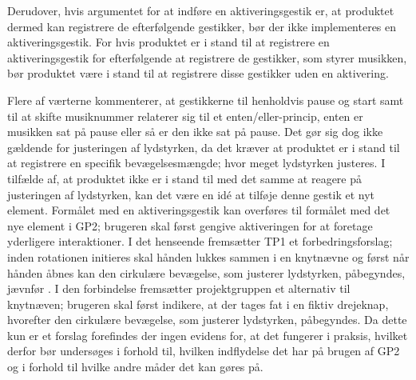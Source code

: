 Derudover, hvis argumentet for at indføre en aktiveringsgestik er, at produktet dermed kan registrere de efterfølgende gestikker, bør der ikke implementeres en aktiveringsgestik. For hvis produktet er i stand til at registrere en aktiveringsgestik for efterfølgende at registrere de gestikker, som styrer musikken, bør produktet være i stand til at registrere disse gestikker uden en aktivering. 

Flere af værterne kommenterer, at gestikkerne til henholdvis pause og start samt til at skifte musiknummer relaterer sig til et enten/eller-princip, enten er musikken sat på pause eller så er den ikke sat på pause. Det gør sig dog ikke gældende for justeringen af lydstyrken, da det kræver at produktet er i stand til at registrere en specifik bevægelsesmængde; hvor meget lydstyrken justeres. I tilfælde af, at produktet ikke er i stand til med det samme at reagere på justeringen af lydstyrken, kan det være en idé at tilføje denne gestik et nyt element. Formålet med en aktiveringsgestik kan overføres til formålet med det nye element i GP2; brugeren skal først gengive aktiveringen for at foretage yderligere interaktioner. I det henseende fremsætter TP1 et forbedringsforslag; inden rotationen initieres skal hånden lukkes sammen i en knytnævne og først når hånden åbnes kan den cirkulære bevægelse, som justerer lydstyrken, påbegyndes, jævnfør . I den forbindelse fremsætter projektgruppen et alternativ til knytnæven; brugeren skal først indikere, at der tages fat i en fiktiv drejeknap, hvorefter den cirkulære bevægelse, som justerer lydstyrken, påbegyndes. Da dette kun er et forslag forefindes der ingen evidens for, at det fungerer i praksis, hvilket derfor bør undersøges i forhold til, hvilken indflydelse det har på brugen af GP2 og i forhold til hvilke andre måder det kan gøres på.       


